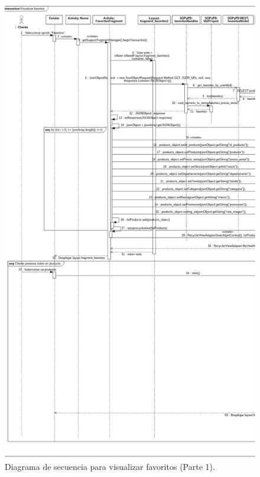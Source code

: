 \FloatBarrier
\begin{figure}[htbp!]
		\centering
			\includegraphics[width=.72 \textwidth]{imagenes/Diagramas_UserApp/Nuevos_diagramas/Favoritos1}
		\caption{Diagrama de secuencia para visualizar favoritos (Parte 1).}
		\label{image:favs2}
\end{figure}
\FloatBarrier

